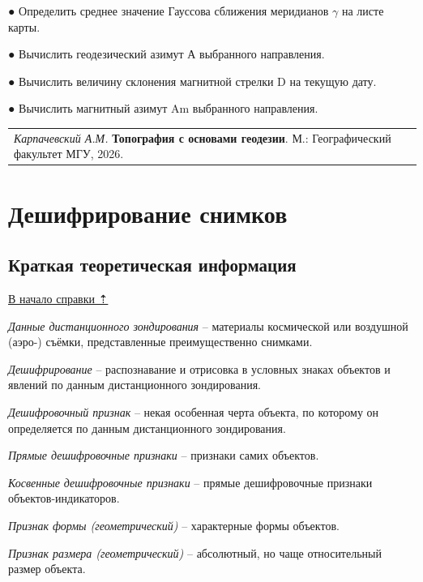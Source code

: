\documentclass[
  russian,
  letterpaper,
  DIV=11,
  numbers=noendperiod]{scrreprt}
\begin{document}
● Определить среднее значение Гауссова сближения меридианов \(\gamma\)
на листе карты.

● Вычислить геодезический азимут А выбранного направления.

● Вычислить величину склонения магнитной стрелки D на текущую дату.

● Вычислить магнитный азимут Am выбранного направления.

\begin{longtable}[]{@{}l@{}}
\toprule\noalign{}
\endhead
\bottomrule\noalign{}
\endlastfoot
\emph{Карпачевский А.М.} \textbf{Топография с основами геодезии}. М.:
Географический факультет МГУ, 2026. \\
\end{longtable}


\chapter{Дешифрирование
снимков}\label{ux434ux435ux448ux438ux444ux440ux438ux440ux43eux432ux430ux43dux438ux435-ux441ux43dux438ux43cux43aux43eux432}

\label{interpretation}{}

\section{Краткая теоретическая информация}\label{interpretation-theory}

\hyperref[interpretation]{В начало справки ⇡}

\emph{Данные дистанционного зондирования} -- материалы космической или
воздушной (аэро-) съёмки, представленные преимущественно снимками.

\emph{Дешифрирование} -- распознавание и отрисовка в условных знаках
объектов и явлений по данным дистанционного зондирования.

\emph{Дешифровочный признак} -- некая особенная черта объекта, по
которому он определяется по данным дистанционного зондирования.

\emph{Прямые дешифровочные признаки} -- признаки самих объектов.

\emph{Косвенные дешифровочные признаки} -- прямые дешифровочные признаки
объектов-индикаторов.

\emph{Признак формы (геометрический)} -- характерные формы объектов.

\emph{Признак размера (геометрический)} -- абсолютный, но чаще
относительный размер объекта.
\end{document}
